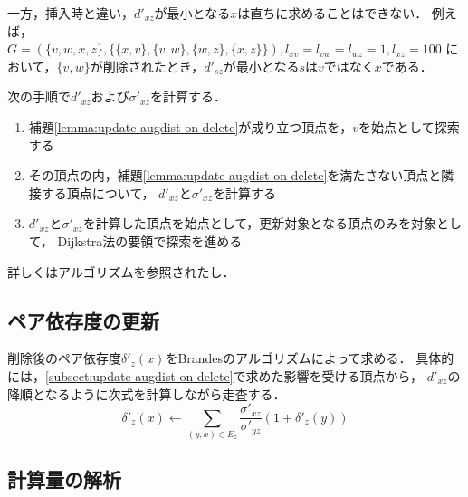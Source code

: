 一方，挿入時と違い，$d'_{xz}$が最小となる$x$は直ちに求めることはできない．
例えば，$G=(\{v,w,x,z\},\{\{x,v\},\{v,w\},\{w,z\},\{x,z\}\}),l_{xv}=l_{vw}=l_{wz}=1,l_{xz}=100$
において，$\{v,w\}$が削除されたとき，$d'_{sz}$が最小となる$s$は$v$ではなく$x$である．

次の手順で$d'_{xz}$および$\sigma'_{xz}$を計算する．
\begin{enumerate}
\item 補題\ref{lemma:update-augdist-on-delete}が成り立つ頂点を，$v$を始点として探索する
\item その頂点の内，補題\ref{lemma:update-augdist-on-delete}を満たさない頂点と隣接する頂点について，
  $d'_{xz}$と$\sigma'_{xz}$を計算する
\item $d'_{xz}$と$\sigma'_{xz}$を計算した頂点を始点として，更新対象となる頂点のみを対象として，
  Dijkstra法の要領で探索を進める
\end{enumerate}
詳しくはアルゴリズムを参照されたし．

\subsection{ペア依存度の更新}
\label{subsect:update-delta-on-delete}

削除後のペア依存度$\delta'_z(x)$をBrandesのアルゴリズムによって求める．
具体的には，\ref{subsect:update-augdist-on-delete}で求めた影響を受ける頂点から，
$d'_{xz}$の降順となるように次式を計算しながら走査する．
\[ \delta'_{z}(x)\gets\sum_{(y,x)\in E_z}\frac{\sigma'_{xz}}{\sigma'_{yz}}(1+\delta'_z(y)) \]

\subsection{計算量の解析}

